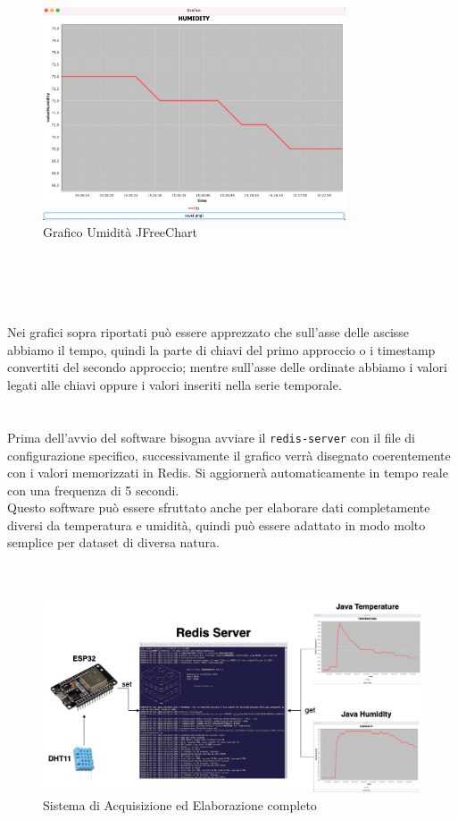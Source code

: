 \begin{figure}[H]
    \begin{center}
        \includegraphics[width=0.8\textwidth]{img/graficoHum}
    \end{center}
    \caption{Grafico Umidità JFreeChart}
\end{figure}\\
\\
\\
\\
Nei grafici sopra riportati può essere apprezzato che sull'asse delle ascisse abbiamo il tempo, quindi la parte di chiavi del primo approccio o i timestamp convertiti del secondo approccio;
mentre sull'asse delle ordinate abbiamo i valori legati alle chiavi oppure i valori inseriti nella serie temporale.\\
\\
\\
Prima dell'avvio del software bisogna avviare il \texttt{redis-server} con il file di configurazione specifico,
successivamente il grafico verrà disegnato coerentemente con i valori memorizzati in Redis.
Si aggiornerà automaticamente in tempo reale con una frequenza di 5 secondi.\\
Questo software può essere sfruttato anche per elaborare dati completamente diversi da temperatura e umidità, quindi può essere
adattato in modo molto semplice per dataset di diversa natura.\\
\\
\\
\begin{figure}[H]
    \begin{center}
        \includegraphics[width=1\textwidth]{img/casoRealeCompleto}
    \end{center}
    \label{casoRealeCompleto}
    \caption{Sistema di Acquisizione ed Elaborazione completo}
\end{figure}
